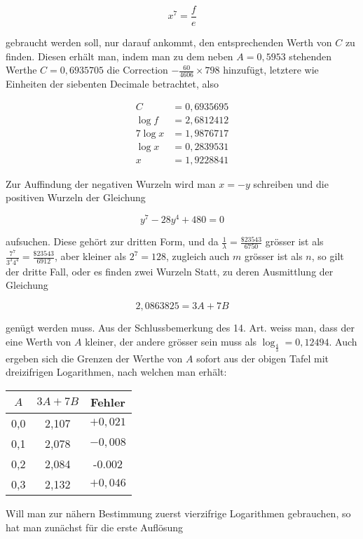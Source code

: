 \documentclass[10pt]{article}
\begin{document}
\[
x^{7}=\frac{f}{e}
\]

gebraucht werden soll, nur darauf ankommt, den entsprechenden Werth von \(C\) zu finden. Diesen erhält man, indem man zu dem neben \(A=0,5953\) stehenden Werthe \(C=0,6935705\) die Correction \(-\frac{60}{4606} \times 798\) hinzufügt, letztere wie Einheiten der siebenten Decimale betrachtet, also

\[
\begin{aligned}
C & =0,6935695 \\
\log f & =2,6812412 \\
\hline 7 \log x & =1,9876717 \\
\log x & =0,2839531 \\
x & =1,9228841
\end{aligned}
\]

Zur Auffindung der negativen Wurzeln wird man \(x=-y\) schreiben und die positiven Wurzeln der Gleichung

\[
y^{7}-28 y^{4}+480=0
\]

aufsuchen. Diese gehört zur dritten Form, und da \(\frac{1}{\lambda}=\frac{\$ 23543}{6750}\) grösser ist als \(\frac{7^{7}}{3^{3} 4^{4}}=\frac{\$ 23543}{6912}\), aber kleiner als \(2^{7}=128\), zugleich auch \(m\) grösser ist als \(n\), so gilt der dritte Fall, oder es finden zwei Wurzeln Statt, zu deren Ausmittlung der Gleichung

\[
2,0863825=3 A+7 B
\]

genügt werden muss. Aus der Schlussbemerkung des 14. Art. weiss man, dass der eine Werth von \(A\) kleiner, der andere grösser sein muss als \(\log _{\frac{4}{3}}=0,12494\). Auch ergeben sich die Grenzen der Werthe von \(A\) sofort aus der obigen Tafel mit dreizifrigen Logarithmen, nach welchen man erhält:

\begin{center}
\begin{tabular}{c|c|c}
\(A\) & \(3 A+7 B\) & Fehler \\
\hline
0,0 & 2,107 & \(+0,021\) \\
0,1 & 2,078 & \(-0,008\) \\
0,2 & 2,084 & -0.002 \\
0,3 & 2,132 & \(+0,046\) \\
\end{tabular}
\end{center}

Will man zur nähern Bestimmung zuerst vierzifrige Logarithmen gebrauchen, so hat man zunächst für die erste Auflösung
\end{document}
